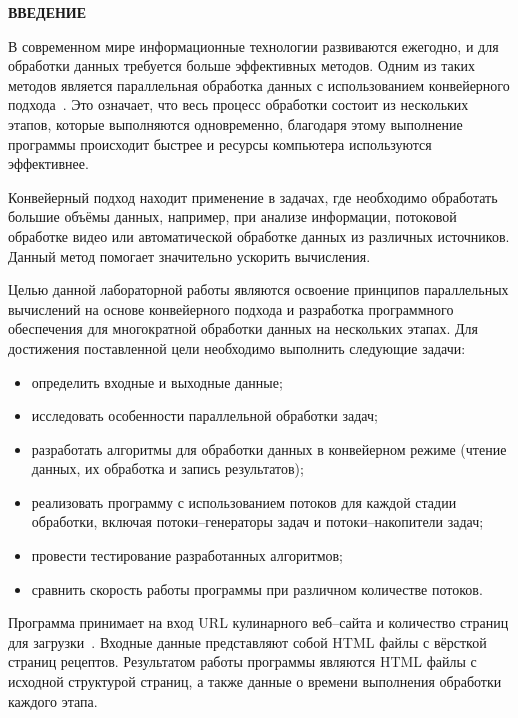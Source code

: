 \begin{center}
    \textbf{ВВЕДЕНИЕ}
\end{center}
В современном мире информационные технологии развиваются ежегодно, и для обработки данных требуется больше эффективных методов. Одним из таких методов является параллельная обработка данных с использованием конвейерного подхода~\cite{tanvar_parallel_programming}. Это означает, что весь процесс обработки состоит из нескольких этапов, которые выполняются одновременно, благодаря этому выполнение программы происходит быстрее и ресурсы компьютера используются эффективнее.

Конвейерный подход находит применение в задачах, где необходимо обработать большие объёмы данных, например, при анализе информации, потоковой обработке видео или автоматической обработке данных из различных источников. Данный метод помогает значительно ускорить вычисления.

Целью данной лабораторной работы являются освоение принципов параллельных вычислений на основе конвейерного подхода и разработка программного обеспечения для многократной обработки данных на нескольких этапах.
Для достижения поставленной цели необходимо выполнить следующие задачи:
\begin{itemize}
    \item определить входные и выходные данные;
    \item исследовать особенности параллельной обработки задач;
    \item разработать алгоритмы для обработки данных в конвейерном режиме (чтение данных, их обработка и запись результатов);
    \item реализовать программу с использованием потоков для каждой стадии обработки, включая потоки--генераторы задач и потоки--накопители задач;
    \item провести тестирование разработанных алгоритмов;
    \item сравнить скорость работы программы при различном количестве потоков.
\end{itemize}

\newpage
{}

Программа принимает на вход URL кулинарного веб--сайта и количество страниц для загрузки~\cite{eda_menu}. Входные данные представляют собой HTML файлы с вёрсткой страниц рецептов. Результатом работы программы являются HTML файлы с исходной структурой страниц, а также данные о времени выполнения обработки каждого этапа.


